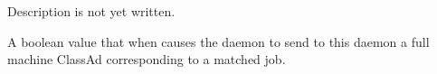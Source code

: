 \begin{description}
\item[\AdAttr{VirtualMemory}:] Description is not yet written.

\item[\AdAttr{WantResAd}:] A boolean value that when 
  causes the  daemon to send to this 
  daemon a full machine ClassAd corresponding to a matched job.


\end{description}


